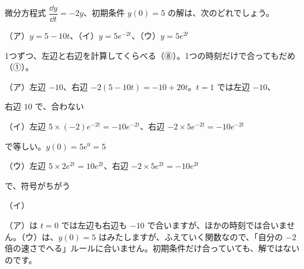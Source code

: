 \begin{reidai}[解でないものを見分ける]
微分方程式 $\dfrac{\dd y}{\dd t}=-2y$、初期条件 $y(0)=5$ の解は、次のどれでしょう。\par
\quad （ア）$y=5-10t$、（イ）$y=5e^{-2t}$、（ウ）$y=5e^{2t}$\par
\kangaekata 1つずつ、左辺と右辺を計算してくらべる（⑧）。1つの時刻だけで合ってもだめ（①）。\par
\shiki （ア）左辺 $-10$、右辺 $-2(5-10t)=-10+20t$。$t=1$ では左辺 $-10$、\par
\hspace*{4.6\zw}右辺 $10$ で、合わない\par
\hspace*{2.6\zw}（イ）左辺 $5\times(-2)e^{-2t}=-10e^{-2t}$、右辺 $-2\times5e^{-2t}=-10e^{-2t}$\par
\hspace*{4.6\zw}で等しい。$y(0)=5e^0=5$\par
\hspace*{2.6\zw}（ウ）左辺 $5\times2e^{2t}=10e^{2t}$、右辺 $-2\times5e^{2t}=-10e^{2t}$\par
\hspace*{4.6\zw}で、符号がちがう\par
\kotae （イ）
\end{reidai}
（ア）は $t=0$ では左辺も右辺も $-10$ で合いますが、ほかの時刻では合いません。（ウ）は、$y(0)=5$ はみたしますが、ふえていく関数なので、「自分の $-2$ 倍の速さでへる」ルールに合いません。初期条件だけ合っていても、解ではないのです。

